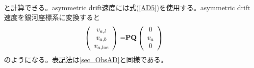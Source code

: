 と計算できる。asymmetric drift速度には式(\ref{AD5})を使用する。asymmetric drift速度を銀河座標系に変換すると
\begin{align}
\begin{aligned}
	\left(
	\begin{array}{c}
	 	v_{a,l}\\
		v_{a,b}\\
		v_{a,\mathrm{los}}
	\end{array}
	\right)
	=& \bf{P} \bf{Q}
	\left(
	\begin{array}{c}
	 	0\\
		v_a\\
		0
	\end{array}
	\right)
\end{aligned}
\end{align}
のようになる。表記法は\ref{sec_ObsAD}と同様である。

